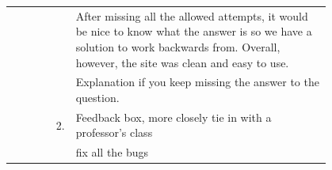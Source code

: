 \begin{longtable}{r|p{0.8\linewidth}}
		& After missing all the allowed attempts, it would be nice to know what the answer is so we have a solution to work backwards from. Overall, however, the site was clean and easy to use.                                                                                                                                                                                                                                                                                                                                                                                                                                                                                                                                                          \\
		& Explanation if you keep missing the answer to the question.                                                                                                                                                                                                                                                                                                                                                                                                                                                                                                                                                                                                                                                                                      \\
		\hline
		2. & Feedback box, more closely tie in with a professor's class                                                                                                                                                                                                                                                                                                                                                                                                                                                                                                                                                                                                                                                                                       \\
		& fix all the bugs                                                                                                                                                                                                                                                                                                                                                                                                                                                                                                                                                                                                                                                                                                                                 \\

\end{longtable}
